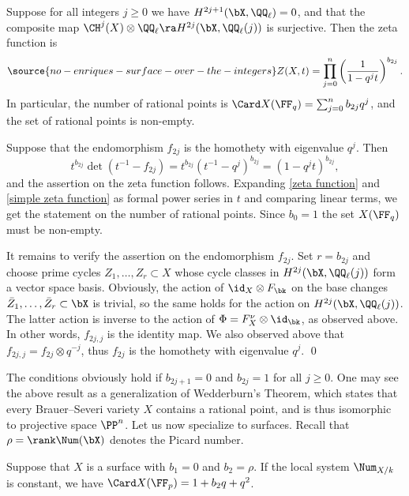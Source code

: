 \begin{proposition}
\notready
\label{generalization wedderburn}
Suppose for all integers $j\geq 0$ we have $H^{2j+1}(\bX,\QQ_\ell)=0$, and that the
composite map $\CH^j(X)\otimes\QQ_\ell \ra H^{2j}(\bX,\QQ_\ell(j))$ is surjective.
Then the zeta function is
\begin{equation}
\label{simple zeta function}
\source{no-enriques-surface-over-the-integers}
Z(X,t) = \prod_{j=0}^{n}\left(\frac{1}{1-q^jt}\right)^{b_{2j}}.
\end{equation}
In particular, the number of rational points is $\Card X(\FF_q)= \sum_{j=0}^{n} b_{2j}q^j$, and  the set of rational points is non-empty.
\end{proposition}

\proof
Suppose  that the endomorphism $f_{2j}$ is the homothety with eigenvalue $q^j$. Then
$$
t^{b_{2j}}\det(t^{-1}-f_{2j}) = t^{b_{2j}}(t^{-1}-q^j)^{b_{2j}} = (1- q^jt)^{b_{2j}},
$$
and the assertion on the zeta function follows. Expanding \eqref{zeta function} and \eqref{simple zeta function}
as formal power series in $t$ and comparing linear terms, we get the statement on the number of rational points.
Since $b_0=1$ the set  $X(\FF_q)$ must be non-empty.

It remains to verify the assertion on the endomorphism $f_{2j}$.
Set $r=b_{2j}$ and choose prime cycles $Z_1,\ldots,Z_r\subset X$ whose cycle classes in $H^{2j}(\bX,\QQ_\ell(j))$ form
a vector space basis. Obviously, the action of $\id_X\otimes F_\bk$ on the base changes $\bar{Z}_1,\ldots,\bar{Z}_r\subset\bX$ is trivial,
so  the same holds for the action on $H^{2j}(\bX,\QQ_\ell(j))$. The latter action is   inverse to the action of
$\Phi=F_X^\nu\otimes\id_\bk$, as observed above.  In other words, $f_{2j,j}$ is the identity map.
We also observed above that $f_{2j,j}=f_{2j}\otimes q^{-j}$, thus $f_{2j}$ is the homothety with eigenvalue $q^j$.
\qed


The conditions obviously hold if $b_{2j+1}=0$ and $b_{2j}=1$ for all $j\geq 0$. One may see the above result
as a generalization of  Wedderburn's Theorem, which states that every Brauer--Severi variety $X$ contains a rational point,
and is thus isomorphic to   projective  space $\PP^n$.
Let us now specialize to surfaces. Recall that $\rho=\rank \Num(\bX)$ denotes the Picard number.

\begin{corollary}
\notready
Suppose that $X$ is a surface with $b_1=0$ and $b_2=\rho$.
If the local system $\Num_{X/k}$ is constant, we have $\Card X(\FF_p)= 1+b_2q+q^2$.
\end{corollary}

